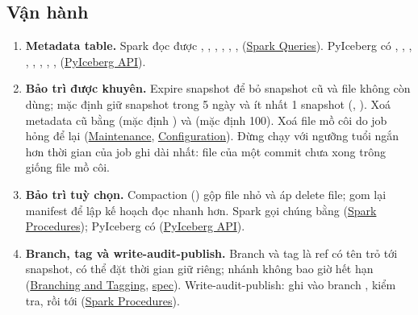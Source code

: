 \subsection{Vận hành}
\begin{enumerate}[resume]
  \item \textbf{Metadata table.} Spark đọc được , , , , , ,  (\href{https://iceberg.apache.org/docs/latest/spark-queries/}{Spark Queries}). PyIceberg có , , , , , , , ,  (\href{https://py.iceberg.apache.org/api/}{PyIceberg API}).
  \item \textbf{Bảo trì được khuyên.} Expire snapshot để bỏ snapshot cũ và file không còn dùng; mặc định giữ snapshot trong 5 ngày và ít nhất 1 snapshot (, ). Xoá metadata cũ bằng  (mặc định ) và  (mặc định 100). Xoá file mồ côi do job hỏng để lại (\href{https://iceberg.apache.org/docs/latest/maintenance/}{Maintenance}, \href{https://iceberg.apache.org/docs/latest/configuration/}{Configuration}). Đừng chạy  với ngưỡng tuổi ngắn hơn thời gian của job ghi dài nhất: file của một commit chưa xong trông giống file mồ côi.
  \item \textbf{Bảo trì tuỳ chọn.} Compaction () gộp file nhỏ và áp delete file;  gom lại manifest để lập kế hoạch đọc nhanh hơn. Spark gọi chúng bằng  (\href{https://iceberg.apache.org/docs/latest/spark-procedures/}{Spark Procedures}); PyIceberg có  (\href{https://py.iceberg.apache.org/api/}{PyIceberg API}).
  \item \textbf{Branch, tag và write-audit-publish.} Branch và tag là ref có tên trỏ tới snapshot, có thể đặt thời gian giữ riêng; nhánh  không bao giờ hết hạn (\href{https://iceberg.apache.org/docs/latest/branching/}{Branching and Tagging}, \href{https://iceberg.apache.org/spec/}{spec}). Write-audit-publish: ghi vào branch , kiểm tra, rồi   tới  (\href{https://iceberg.apache.org/docs/latest/spark-procedures/}{Spark Procedures}).

\end{enumerate}
